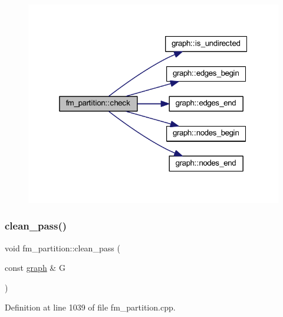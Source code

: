 \begin{figure}[H]
\begin{center}
\leavevmode
\includegraphics[width=319pt]{classfm__partition_af72a9fcc300ab0f202168c819b089e5d_cgraph}
\end{center}
\end{figure}
\mbox{\label{classfm__partition_a15197263e5318f824e0cde66ea9132b7}} 
\subsubsection{\texorpdfstring{clean\+\_\+pass()}{clean\_pass()}}
{\footnotesize\ttfamily void fm\+\_\+partition\+::clean\+\_\+pass (\begin{DoxyParamCaption}\item[{const \mbox{\hyperlink{classgraph}{graph}} \&}]{G }\end{DoxyParamCaption})\hspace{0.3cm}{\ttfamily [protected]}}



Definition at line 1039 of file fm\+\_\+partition.\+cpp.


